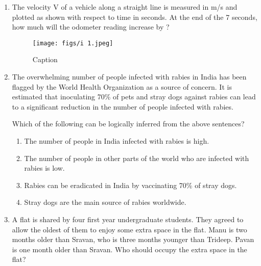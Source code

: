 \documentclass[journal]{IEEEtran}
\begin{document}
\begin{enumerate}
            
    \item The velocity V of a vehicle along a straight line is measured in m/s and plotted as shown with respect to time in seconds. At the end of the 7 seconds, how much will the odometer reading increase by ?
   \begin{figure}
       \centering
       \texttt{[image: figs/i 1.jpeg]}
       \caption{Caption}
       \label{fig:placeholder}
   \end{figure}
    
    
    \begin{enumerate}  \end{enumerate}              
    
    \hfill{}
    
 \item The overwhelming number of people infected with rabies in India has been flagged by the World Health Organization as a source of concern. It is estimated that inoculating 70\% of pets and stray dogs against rabies can lead to a significant reduction in the number of people infected with rabies.
    
    Which of the following can be logically inferred from the above sentences?
    
    \begin{enumerate}              
        \item The number of people in India infected with rabies is high.
        \item The number of people in other parts of the world who are infected with rabies is low.
        \item Rabies can be eradicated in India by vaccinating 70\% of stray dogs.
        \item Stray dogs are the main source of rabies worldwide.
    \end{enumerate}              
    
    \hfill{}
    
    \item A flat is shared by four first year undergraduate students. They agreed to allow the oldest of them to enjoy some extra space in the flat. Manu is two months older than Sravan, who is three months younger than Trideep. Pavan is one month older than Sravan. Who should occupy the extra space in the flat?
    

\end{enumerate}
\end{document}
